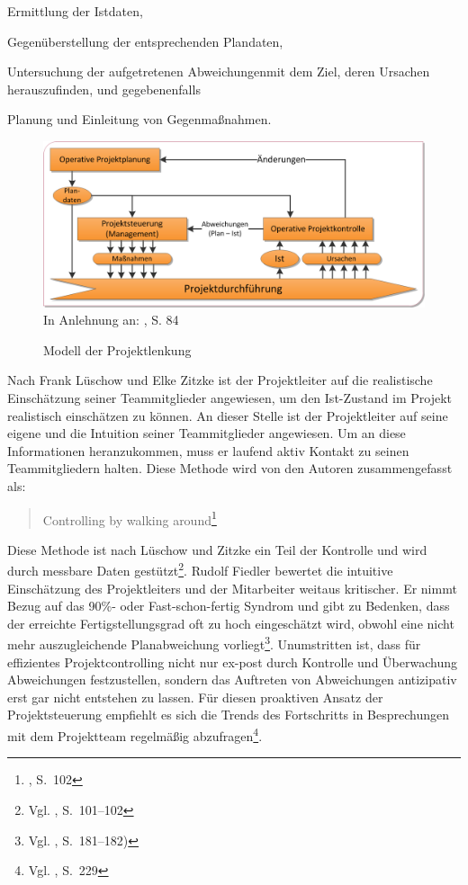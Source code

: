 \begin{compactitem}
\item Ermittlung der Istdaten,
\item Gegenüberstellung der entsprechenden Plandaten,
\item Untersuchung der aufgetretenen Abweichungenmit dem Ziel, deren Ursachen herauszufinden, und gegebenenfalls
\item Planung und Einleitung von Gegenmaßnahmen.
\end{compactitem}
\begin{figure}[htbp]
\begin{center}
\includegraphics[width=1\textwidth]{Images/Steuerung.png}
{\footnotesize In Anlehnung an: \cite{Litke2007}, S. 84}
\caption[Modell der Projektlenkung]{Modell der Projektlenkung}\label{abb8}
\end{center}
\end{figure}
Nach Frank Lüschow und Elke Zitzke ist der Projektleiter auf die realistische Einschätzung seiner Teammitglieder angewiesen, um den Ist-Zustand im Projekt realistisch einschätzen zu können. An dieser Stelle ist der Projektleiter auf seine eigene und die Intuition seiner Teammitglieder angewiesen. Um an diese Informationen heranzukommen, muss er laufend aktiv Kontakt zu seinen Teammitgliedern halten. Diese Methode wird von den Autoren zusammengefasst als:\begin{quote}\glqq Controlling by walking around\grqq\footnote{\cite{Luschow&Zitzke2004}, S.~102}\end{quote}
Diese Methode ist nach Lüschow und Zitzke ein Teil der Kontrolle und wird durch messbare Daten gestützt\footnote{Vgl. \cite{Luschow&Zitzke2004}, S.~101--102}. Rudolf Fiedler bewertet die intuitive Einschätzung des Projektleiters und der Mitarbeiter weitaus kritischer. Er nimmt Bezug auf das 90\%- oder Fast-schon-fertig Syndrom und gibt zu Bedenken, dass der erreichte Fertigstellungsgrad oft zu hoch eingeschätzt wird, obwohl eine nicht mehr auszugleichende Planabweichung vorliegt\footnote{Vgl. \cite{Litke2007}, S.~181--182)}. 
Unumstritten ist, dass für effizientes Projektcontrolling nicht nur ex-post 
durch Kontrolle und Überwachung Abweichungen festzustellen, sondern das 
Auftreten von Abweichungen antizipativ erst gar nicht entstehen zu lassen. Für diesen proaktiven Ansatz der Projektsteuerung empfiehlt es sich die Trends des Fortschritts in Besprechungen mit dem Projektteam regelmäßig abzufragen\footnote{Vgl. \cite{Bergmann&Garrecht2008}, S.~229}. 

